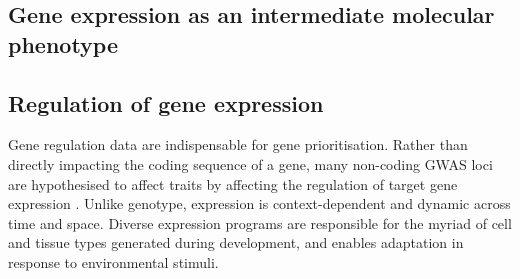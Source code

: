 \begin{outline}
%

\section{Gene expression as an intermediate molecular phenotype}

\subsection{Regulation of gene expression}


Gene regulation data are indispensable for gene prioritisation. 
Rather than directly impacting the coding sequence of a gene, 
many non-coding \gls{GWAS} loci are hypothesised to affect traits by affecting the regulation of target gene expression \autocite{gallagher2018PostGWASEraAssociation,cano-gamez2020GWASFunctionUsing}.
Unlike genotype, expression is context-dependent and dynamic across time and space.
Diverse expression programs are responsible for the myriad of cell and tissue types generated during development,
and enables adaptation in response to environmental stimuli.


\end{outline}
